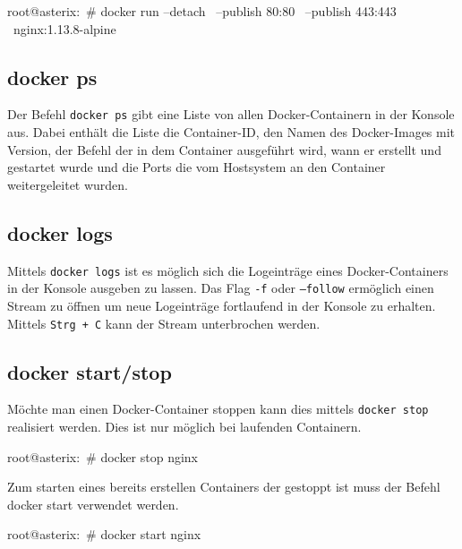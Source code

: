 \begin{bashcode}
  root@asterix:~# docker run --detach \
    --publish 80:80 \
    --publish 443:443 \
    nginx:1.13.8-alpine
\end{bashcode}

\subsection{docker ps}%
\label{sec:docker-befehle.ps}
Der Befehl \texttt{docker ps} gibt eine Liste von allen Docker-Containern in der Konsole aus. Dabei enthält die Liste die Container-ID, den Namen des Docker-Images mit Version, der Befehl der in dem Container ausgeführt wird, wann er erstellt und gestartet wurde und die Ports die vom Hostsystem an den Container weitergeleitet wurden.

\subsection{docker logs}%
\label{sec:docker-befehle.logs}
Mittels \texttt{docker logs} ist es möglich sich die Logeinträge eines Docker-Containers in der Konsole ausgeben zu lassen. Das Flag \texttt{-f} oder \texttt{--follow} ermöglich einen Stream zu öffnen um neue Logeinträge fortlaufend in der Konsole zu erhalten. Mittels \texttt{Strg + C} kann der Stream unterbrochen werden.

\subsection{docker start/stop}%
\label{sec:docker-befehle.start-stop}
Möchte man einen Docker-Container stoppen kann dies mittels \texttt{docker stop} realisiert werden. Dies ist nur möglich bei laufenden Containern.

\begin{bashcode}
   root@asterix:~# docker stop nginx
\end{bashcode}

Zum starten eines bereits erstellen Containers der gestoppt ist muss der Befehl docker start verwendet werden.

\begin{bashcode}
  root@asterix:~# docker start nginx
\end{bashcode}

